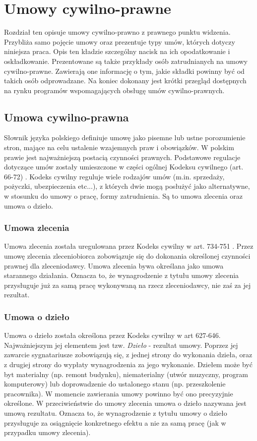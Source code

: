 \chapter{Umowy cywilno-prawne}
\label{chap2}
Rozdział ten opisuje umowy cywilno-prawno z prawnego punktu widzenia. Przybliża samo pojęcie umowy oraz prezentuje typy umów, których dotyczy niniejsza praca. Opis ten kładzie szczególny nacisk na ich opodatkowanie i oskładkowanie. Prezentowane są także przykłady osób zatrudnianych na umowy cywilno-prawne. Zawierają one informację o tym, jakie składki powinny być od takich osób odprowadzane. Na koniec dokonany jest krótki przegląd dostępnych na rynku programów wspomagających obsługę umów cywilno-prawnych.

\section[Umowa cywilno-prawna][Umowa cywilno-prawna]{Umowa cywilno-prawna}
Słownik języka polskiego \cite{slownikJP} definiuje umowę jako pisemne lub ustne porozumienie stron, mające na celu ustalenie wzajemnych praw i obowiązków. W polskim prawie jest najważniejszą postacią czynności prawnych. Podstawowe regulacje dotyczące umów zostały umieszczone w części ogólnej Kodeksu cywilnego (art. 66-72) \cite{kodeksCywilny}. Kodeks cywilny reguluje wiele rodzajów umów (m.in. sprzedaży, pożyczki, ubezpieczenia etc...), z których dwie mogą posłużyć jako alternatywne, w stosunku do umowy o pracę, formy zatrudnienia. Są to umowa zlecenia oraz umowa o dzieło.

\subsection[Umowa zlecenia][Umowa zlecenia]{Umowa zlecenia}
Umowa zlecenia została uregulowana przez Kodeks cywilny w art. 734-751 \cite{kodeksCywilny}. Przez umowę zlecenia zleceniobiorca zobowiązuje się do dokonania określonej czynności prawnej dla zleceniodawcy. Umowa zlecenia bywa określana jako umowa starannego działania. Oznacza to, że wynagrodzenie z tytułu umowy zlecenia przysługuje już za samą pracę wykonywaną na rzecz zleceniodawcy, nie zaś za jej rezultat.

\subsection[Umowa o dzieło][Umowa o dzieło]{Umowa o dzieło}
Umowa o dzieło została określona przez Kodeks cywilny w art 627-646\cite{kodeksCywilny}. Najważniejszym jej elementem jest tzw. \textit{Dzieło} - rezultat umowy. Poprzez jej zawarcie sygnatariusze zobowiązują się, z jednej strony do wykonania dzieła, oraz z drugiej strony do wypłaty wynagrodzenia za jego wykonanie. Dziełem może być byt materialny (np. remont budynku), niematerialny (utwór muzyczny, program komputerowy) lub doprowadzenie do ustalonego stanu (np. przeszkolenie pracownika). W momencie zawierania umowy powinno być ono precyzyjnie określone. W przeciwieństwie do umowy zlecenia umowa o dzieło nazywana jest umową rezultatu. Oznacza to, że wynagrodzenie z tytułu umowy o dzieło przysługuje za osiągnięcie konkretnego efektu a nie za samą pracę (jak w przypadku umowy zlecenia).

